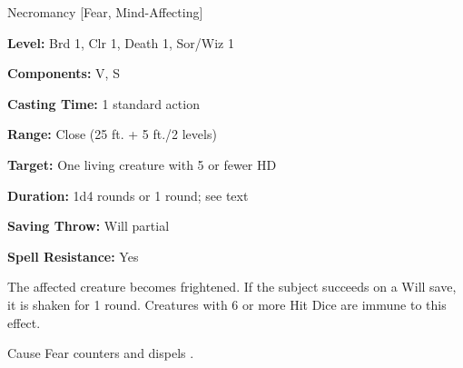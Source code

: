 
Necromancy [Fear, Mind-Affecting]

\textbf{Level:} Brd 1, Clr 1, Death 1, Sor/Wiz 1

\textbf{Components:} V, S

\textbf{Casting Time:} 1 standard action

\textbf{Range:} Close (25 ft. + 5 ft./2 levels)

\textbf{Target:} One living creature with 5 or fewer HD

\textbf{Duration:} 1d4 rounds or 1 round; see text

\textbf{Saving Throw:} Will partial

\textbf{Spell Resistance:} Yes

The affected creature becomes frightened. If the subject succeeds on a Will save, 
it is shaken for 1 round. Creatures with 6 or more Hit Dice are immune to this 
effect.

Cause Fear counters and dispels .

